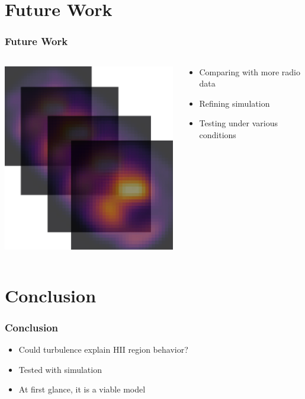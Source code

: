 \documentclass[aspectratio=169,compress]{beamer}
\begin{document}
\section{Future Work}
\begin{frame}
  \frametitle{Future Work}
  \begin{columns}
    \begin{column}{0.5\linewidth}
      \includegraphics[width=0.7\linewidth]{figures/lagslides.png}
    \end{column}
    \begin{column}{0.5\linewidth}
      \begin{itemize}
        \item Comparing with more radio data
        \item Refining simulation
        \item Testing under various conditions
      \end{itemize}
    \end{column}
  \end{columns}
\end{frame}

\section{Conclusion}
\begin{frame}
  \frametitle{Conclusion}
  \begin{itemize}
    \item Could turbulence explain HII region behavior?
    \item Tested with simulation
    \item At first glance, it is a viable model
  \end{itemize}
\end{frame}
\end{document}
